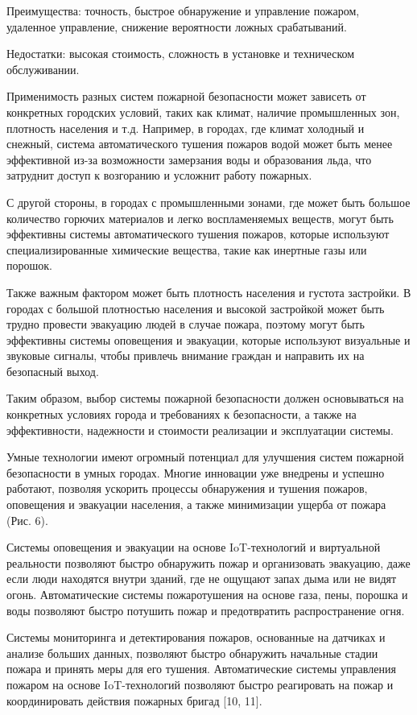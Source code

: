 \begin{multicols}{2}

Преимущества: точность, быстрое обнаружение и управление пожаром,
удаленное управление, снижение вероятности ложных срабатываний.

Недостатки: высокая стоимость, сложность в установке и техническом
обслуживании.

Применимость разных систем пожарной безопасности может зависеть от
конкретных городских условий, таких как климат, наличие промышленных
зон, плотность населения и т.д. Например, в городах, где климат холодный
и снежный, система автоматического тушения пожаров водой может быть
менее эффективной из-за возможности замерзания воды и образования льда,
что затруднит доступ к возгоранию и усложнит работу пожарных.

С другой стороны, в городах с промышленными зонами, где может быть
большое количество горючих материалов и легко воспламеняемых веществ,
могут быть эффективны системы автоматического тушения пожаров, которые
используют специализированные химические вещества, такие как инертные
газы или порошок.

Также важным фактором может быть плотность населения и густота
застройки. В городах с большой плотностью населения и высокой застройкой
может быть трудно провести эвакуацию людей в случае пожара, поэтому
могут быть эффективны системы оповещения и эвакуации, которые используют
визуальные и звуковые сигналы, чтобы привлечь внимание граждан и
направить их на безопасный выход.

Таким образом, выбор системы пожарной безопасности должен основываться
на конкретных условиях города и требованиях к безопасности, а также на
эффективности, надежности и стоимости реализации и эксплуатации системы.

Умные технологии имеют огромный потенциал для улучшения систем пожарной
безопасности в умных городах. Многие инновации уже внедрены и успешно
работают, позволяя ускорить процессы обнаружения и тушения пожаров,
оповещения и эвакуации населения, а также минимизации ущерба от пожара
(Рис. 6).

Системы оповещения и эвакуации на основе IoT-технологий и виртуальной
реальности позволяют быстро обнаружить пожар и организовать эвакуацию,
даже если люди находятся внутри зданий, где не ощущают запах дыма или не
видят огонь. Автоматические системы пожаротушения на основе газа, пены,
порошка и воды позволяют быстро потушить пожар и предотвратить
распространение огня.

Системы мониторинга и детектирования пожаров, основанные на датчиках и
анализе больших данных, позволяют быстро обнаружить начальные стадии
пожара и принять меры для его тушения. Автоматические системы управления
пожаром на основе IoT-технологий позволяют быстро реагировать на пожар и
координировать действия пожарных бригад {[}10, 11{]}.

\end{multicols}

